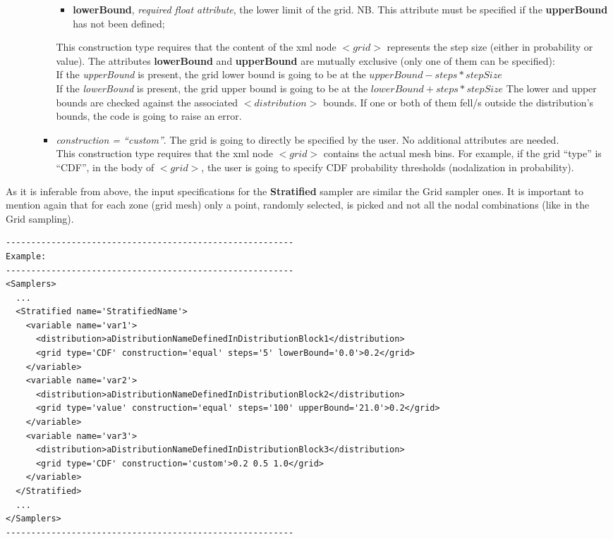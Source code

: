 \begin{itemize}
\begin{itemize}
\begin{itemize}
\begin{itemize}
         \item \textbf{lowerBound}, \textit{required float attribute}, the lower limit of the grid.
        NB. This attribute must be specified if the \textbf{upperBound} has not been defined;
      \end{itemize}
      This construction type requires that the content of the xml node $<grid>$ represents the step size (either in probability or value). The attributes \textbf{lowerBound} and \textbf{upperBound} are mutually exclusive (only one of them can be specified):
      \\ If the \textit{upperBound} is present, the grid lower bound is going to be at the $upperBound - steps*stepSize$
      \\ If the \textit{lowerBound} is present, the grid upper bound is going to be at the $lowerBound + steps*stepSize$
      The lower and upper bounds are checked against the associated $<distribution>$ bounds. If one or both of them fell/s outside the distribution's bounds, the code is going to raise an error.
  \item \textit{construction = ``custom''}. The grid is going to directly be specified by the user. No additional attributes are needed. 
     \\This construction type requires that the xml node $<grid>$  contains the actual mesh bins. For example, if the grid ``type'' is ``CDF'', in the body of $<grid>$, the user is going to specify CDF probability thresholds (nodalization in probability).
\end{itemize}
  \end{itemize}
\end{itemize}
As it is inferable from above, the input specifications for the \textbf{Stratified} sampler are similar the Grid sampler ones. It is important to mention again that for each zone (grid mesh) only a point, randomly selected, is picked and not all the nodal combinations (like in the Grid sampling).

\begin{lstlisting}[style=XML]
---------------------------------------------------------
Example:
---------------------------------------------------------
<Samplers>
  ...
  <Stratified name='StratifiedName'> 
    <variable name='var1'> 
      <distribution>aDistributionNameDefinedInDistributionBlock1</distribution> 
      <grid	type='CDF' construction='equal' steps='5' lowerBound='0.0'>0.2</grid>	
    </variable>
    <variable name='var2'> 
      <distribution>aDistributionNameDefinedInDistributionBlock2</distribution> 
      <grid	type='value' construction='equal' steps='100' upperBound='21.0'>0.2</grid>	
    </variable> 
    <variable name='var3'> 
      <distribution>aDistributionNameDefinedInDistributionBlock3</distribution> 
      <grid	type='CDF' construction='custom'>0.2 0.5 1.0</grid>	
    </variable>
  </Stratified>
  ...
</Samplers>
---------------------------------------------------------
\end{lstlisting}
 
